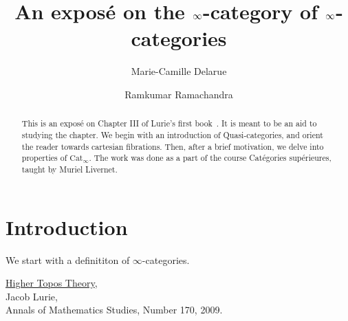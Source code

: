 \documentclass[12pt]{amsart}
\title{An exposé on the $\8$-category of $\8$-categories}
\author{Marie-Camille Delarue}
\author{Ramkumar Ramachandra}
\newcommand{\8}{\infty}
\begin{document}
\begin{abstract}
  This is an exposé on Chapter III of Lurie's first book~\cite{lurie09}. It is meant to be an aid to studying the chapter. We begin with an introduction of Quasi-categories, and orient the reader towards cartesian fibrations. Then, after a brief motivation, we delve into properties of $\textrm{Cat}_\8$. The work was done as a part of the course Catégories supérieures, taught by Muriel Livernet.
\end{abstract}
\maketitle
\tableofcontents

\section{Introduction}
We start with a definititon of $\8$-categories.



\begin{thebibliography}{99}
  \href{https://arxiv.org/abs/math/0608040}{Higher Topos Theory}, \\
  Jacob Lurie, \\
  Annals of Mathematics Studies, Number 170, 2009.
\end{thebibliography}
\end{document}
